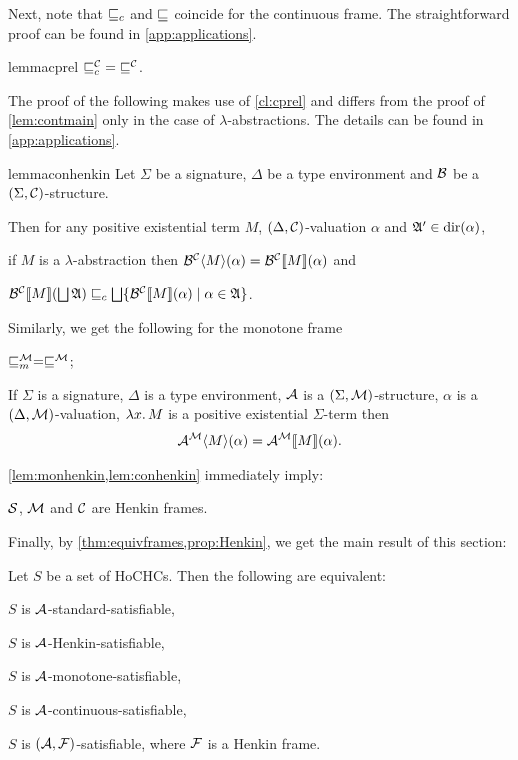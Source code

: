 \documentclass[a4paper,twoside,notitlepage,openright,11pt]{report}
\begin{document}
Next, note that $\sqsubseteq_c$ and $\sqsubseteq$ coincide for the continuous frame. The straightforward proof can be found in \cref{app:applications}.
\begin{restatable}{lemma}{cprel}
  \label{cl:cprel}
  $\sqsubseteq_c^\mathcal C\;=\;\sqsubseteq^\mathcal C$.
\end{restatable}

The proof of the following makes use of \cref{cl:cprel} and differs from the proof of \cref{lem:contmain} only in the case of $\lambda$-abstractions. The details can be found in \cref{app:applications}.
\begin{restatable}{lemma}{conhenkin}
  \label{lem:conhenkin}
  Let $\Sigma$ be a signature, $\Delta$ be a type environment and $\mathcal B$ be a $(\Sigma,\mathcal C)$-structure. 
  
  Then for any positive existential term $M$, $(\Delta,\mathcal C)$-valuation $\alpha$ and $\mathfrak A'\in\operatorname{dir}(\alpha)$,
  \begin{thmlist}
  \item\label{it:conhenkin1} if $M$ is a $\lambda$-abstraction then $\mathcal B^\mathcal C\langle M\rangle(\alpha)={\mathcal B^\mathcal C}\llbracket M\rrbracket(\alpha)$ and
  \item\label{it:conhenkin2} ${\mathcal B^\mathcal C}\llbracket M\rrbracket(\bigsqcup\mathfrak A)\sqsubseteq_c\bigsqcup\{{\mathcal B^\mathcal C}\llbracket M\rrbracket(\alpha)\mid\alpha\in\mathfrak A\}$.
  \end{thmlist}
\end{restatable}
Similarly, we get the following for the monotone frame
\begin{lemma}
  \label{lem:monhenkin}
  \begin{thmlist}
  \item $\sqsubseteq_m^\mathcal M=\sqsubseteq^\mathcal M$;
  \item If $\Sigma$ is a signature, $\Delta$ is a type environment, $\mathcal A$ is a $(\Sigma,\mathcal M)$-structure, $\alpha$ is a $(\Delta,\mathcal M)$-valuation, $\lambda x\ldotp M$ is a positive existential $\Sigma$-term then
    \begin{align*}
      \mathcal A^\mathcal M\langle M\rangle(\alpha)={\mathcal A^\mathcal M}\llbracket M\rrbracket(\alpha).
    \end{align*}
  \end{thmlist}
\end{lemma}
\cref{lem:monhenkin,lem:conhenkin} immediately imply:
\begin{proposition}
  \label{prop:Henkin}
  $\mathcal S$, $\mathcal M$ and $\mathcal C$ are Henkin frames.
\end{proposition}
Finally, by \cref{thm:equivframes,prop:Henkin}, we get the main result of this section:
\begin{theorem}
  \label{thm:equivsem}
  Let $S$ be a set of HoCHCs. Then the following are equivalent:
  \begin{thmlist}
  \item $S$ is $\mathcal A$-standard-satisfiable,
  \item $S$ is $\mathcal A$-Henkin-satisfiable,
  \item $S$ is $\mathcal A$-monotone-satisfiable,
  \item $S$ is $\mathcal A$-continuous-satisfiable,
  \item $S$ is $(\mathcal A,\mathcal F)$-satisfiable, where $\mathcal F$ is a Henkin frame.
  \end{thmlist}
\end{theorem}
\end{document}
